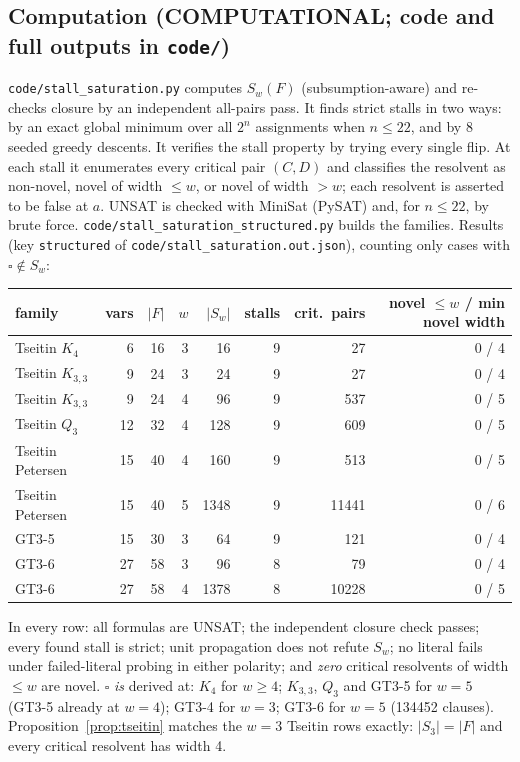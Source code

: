 \documentclass[11pt]{article}
\theoremstyle{definition}
\begin{document}
\subsection*{Computation (COMPUTATIONAL; code and full outputs in \texttt{code/})}
\texttt{code/stall\_saturation.py} computes $S_w(F)$ (subsumption-aware) and re-checks closure by an independent all-pairs pass. It finds strict stalls in two ways: by an exact global minimum over all $2^n$ assignments when $n\le22$, and by 8 seeded greedy descents. It verifies the stall property by trying every single flip. At each stall it enumerates every critical pair $(C,D)$ and classifies the resolvent as non-novel, novel of width $\le w$, or novel of width $>w$; each resolvent is asserted to be false at $a$. UNSAT is checked with MiniSat (PySAT) and, for $n\le22$, by brute force. \texttt{code/stall\_saturation\_structured.py} builds the families. Results (key \texttt{structured} of \texttt{code/stall\_saturation.out.json}), counting only cases with $\square\notin S_w$:
\begin{center}\small
\begin{tabular}{lrrrrrrr}
family & vars & $|F|$ & $w$ & $|S_w|$ & stalls & crit.\ pairs & novel $\le w$ / min novel width\\\hline
Tseitin $K_4$ & 6 & 16 & 3 & 16 & 9 & 27 & 0 / 4\\
Tseitin $K_{3,3}$ & 9 & 24 & 3 & 24 & 9 & 27 & 0 / 4\\
Tseitin $K_{3,3}$ & 9 & 24 & 4 & 96 & 9 & 537 & 0 / 5\\
Tseitin $Q_3$ & 12 & 32 & 4 & 128 & 9 & 609 & 0 / 5\\
Tseitin Petersen & 15 & 40 & 4 & 160 & 9 & 513 & 0 / 5\\
Tseitin Petersen & 15 & 40 & 5 & 1348 & 9 & 11441 & 0 / 6\\
GT3-5 & 15 & 30 & 3 & 64 & 9 & 121 & 0 / 4\\
GT3-6 & 27 & 58 & 3 & 96 & 8 & 79 & 0 / 4\\
GT3-6 & 27 & 58 & 4 & 1378 & 8 & 10228 & 0 / 5\\
\end{tabular}
\end{center}
In every row: all formulas are UNSAT; the independent closure check passes; every found stall is strict; unit propagation does not refute $S_w$; no literal fails under failed-literal probing in either polarity; and \emph{zero} critical resolvents of width $\le w$ are novel. $\square$ \emph{is} derived at: $K_4$ for $w\ge4$; $K_{3,3}$, $Q_3$ and GT3-5 for $w=5$ (GT3-5 already at $w=4$); GT3-4 for $w=3$; GT3-6 for $w=5$ (134452 clauses). Proposition~\ref{prop:tseitin} matches the $w=3$ Tseitin rows exactly: $|S_3|=|F|$ and every critical resolvent has width 4.
\end{document}
